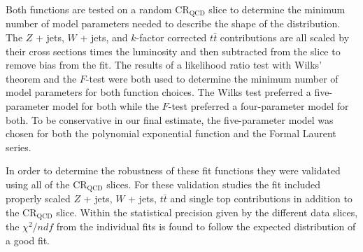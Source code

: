 Both functions are tested on a random $\text{CR}_{\text{QCD}}$ slice to
determine the minimum number of model parameters needed to describe the shape
of the distribution.  The $Z$ + jets, $W$ + jets, and
$k$-factor corrected $t\bar{t}$ contributions are all scaled
by their cross sections times the luminosity and then subtracted from the slice
to remove bias from the fit.  The results of a likelihood ratio test with
Wilks' theorem \cite{wilks1938} and the $F$-test
\cite{snecdecor1991statistical} were both used to determine the minimum number
of model parameters for both function choices.  The Wilks test preferred a
five-parameter model for both while the $F$-test preferred a four-parameter
model for both.  To be conservative in our final estimate, the five-parameter
model was chosen for both the polynomial exponential function and the Formal
Laurent series.

In order to determine the robustness of these fit functions they were validated
using all of the $\text{CR}_{\text{QCD}}$ slices.  For these validation studies
the fit included properly scaled $Z$ + jets, $W$ + jets, $t\bar{t}$ and single
top contributions in addition to the $\text{CR}_{\text{QCD}}$ slice. Within the
statistical precision given by the different data slices, the $\chi^{2}/ndf$
from the individual fits is found to follow the expected distribution of a good
fit.
